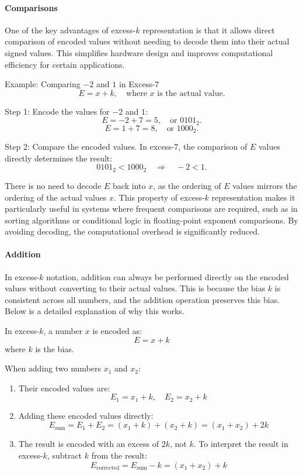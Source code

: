 \paragraph{Comparisons}
One of the key advantages of excess-\( k \) representation is that it allows direct comparison of encoded values without needing to decode them into their actual signed values. This simplifies hardware design and improves computational efficiency for certain applications.

Example: Comparing \( -2 \) and \( 1 \) in Excess-\( 7 \)
\[
E = x + k, \quad \text{where } x \text{ is the actual value}.
\]

Step 1: Encode the values for \( -2 \) and \( 1 \):
\[
E = -2 + 7 = 5, \quad \text{or } 0101_2.
\]
\[
E = 1 + 7 = 8, \quad \text{or } 1000_2.
\]

Step 2: Compare the encoded values.
In excess-\( 7 \), the comparison of \( E \) values directly determines the result:
\[
0101_2 < 1000_2 \quad \Rightarrow \quad -2 < 1.
\]

There is no need to decode \( E \) back into \( x \), as the ordering of \( E \) values mirrors the ordering of the actual values \( x \). This property of excess-\( k \) representation makes it particularly useful in systems where frequent comparisons are required, such as in sorting algorithms or conditional logic in floating-point exponent comparisons. By avoiding decoding, the computational overhead is significantly reduced.

\paragraph{Addition}
In excess-\( k \) notation, addition can always be performed directly on the encoded values without converting to their actual values. This is because the bias \( k \) is consistent across all numbers, and the addition operation preserves this bias. Below is a detailed explanation of why this works.

In excess-\( k \), a number \( x \) is encoded as:
\[
E = x + k
\]
where \( k \) is the bias.

When adding two numbers \( x_1 \) and \( x_2 \):
\begin{enumerate}[left=1cm]
    \item Their encoded values are:
    \[
    E_1 = x_1 + k, \quad E_2 = x_2 + k
    \]
    \item Adding these encoded values directly:
    \[
    E_{\text{sum}} = E_1 + E_2 = (x_1 + k) + (x_2 + k) = (x_1 + x_2) + 2k
    \]
    \item The result is encoded with an excess of \( 2k \), not \( k \). To interpret the result in excess-\( k \), subtract \( k \) from the result:
    \[
    E_{\text{corrected}} = E_{\text{sum}} - k = (x_1 + x_2) + k
    \]
\end{enumerate}

